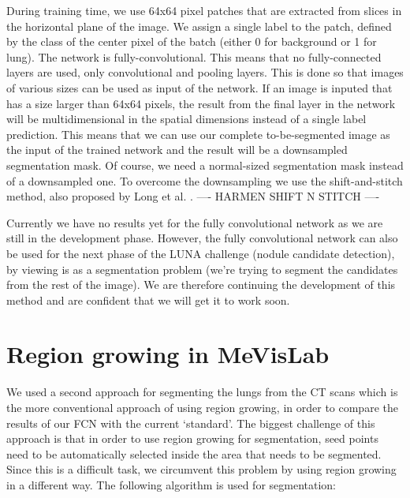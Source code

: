 \documentclass[a4paper,10pt]{article}
\numberwithin{equation}{section} %
\numberwithin{figure}{section} %
\numberwithin{table}{section} %
\begin{document}
During training time, we use 64x64 pixel patches that are extracted from slices in the horizontal plane of the image.
We assign a single label to the patch, defined by the class of the center pixel of the batch (either 0 for background or 1 for lung).
The network is fully-convolutional. This means that no fully-connected layers are used, only convolutional and pooling layers.
This is done so that images of various sizes can be used as input of the network.
If an image is inputed that has a size larger than 64x64 pixels, the result from the final layer in the network will be multidimensional in the spatial dimensions instead of a single label prediction.
This means that we can use our complete to-be-segmented image as the input of the trained network and the result will be a downsampled segmentation mask.
Of course, we need a normal-sized segmentation mask instead of a downsampled one.
To overcome the downsampling we use the shift-and-stitch method, also proposed by Long et al. \cite{long2015fully}.
---- HARMEN SHIFT N STITCH ----

Currently we have no results yet for the fully convolutional network as we are still in the development phase. However, the fully convolutional network can also be used for the next phase of the LUNA challenge (nodule candidate detection), by viewing is as a segmentation problem (we're trying to segment the candidates from the rest of the image). We are therefore continuing the development of this method and are confident that we will get it to work soon.

\section{Region growing in MeVisLab}
We used a second approach for segmenting the lungs from the CT scans which is the more conventional approach of using region growing, in order to compare the results of our FCN with the current `standard'. The biggest challenge of this approach is that in order to use region growing for segmentation, seed points need to be automatically selected inside the area that needs to be segmented. Since this is a difficult task, we circumvent this problem by using region growing in a different way. The following algorithm is used for segmentation:
\end{document}
